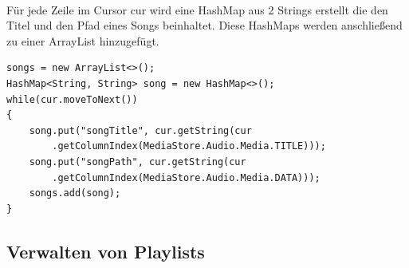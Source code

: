 \documentclass[FIPLY_base.tex]{subfiles}
\begin{document}
\newpage
\ \\
Für jede Zeile im Cursor cur wird eine HashMap aus 2 Strings erstellt die den Titel und den Pfad eines Songs beinhaltet. Diese HashMaps werden anschließend zu einer ArrayList hinzugefügt.
\begin{lstlisting}
songs = new ArrayList<>();
HashMap<String, String> song = new HashMap<>();
while(cur.moveToNext())
{
	song.put("songTitle", cur.getString(cur
		.getColumnIndex(MediaStore.Audio.Media.TITLE)));
	song.put("songPath", cur.getString(cur
		.getColumnIndex(MediaStore.Audio.Media.DATA)));
	songs.add(song);
}
\end{lstlisting}




\subsection {Verwalten von Playlists}
\end{document}
